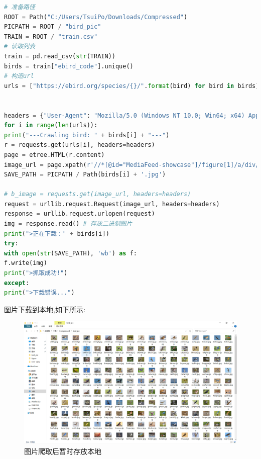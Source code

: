 \begin{itemize}
\begin{lstlisting}[language=python,breaklines=true]
# 准备路径
ROOT = Path("C:/Users/TsuiPo/Downloads/Compressed")
PICPATH = ROOT / "bird_pic"
TRAIN = ROOT / "train.csv"
# 读取列表
train = pd.read_csv(str(TRAIN))
birds = train["ebird_code"].unique()
# 构造url
urls = ["https://ebird.org/species/{}/".format(bird) for bird in birds]


headers = {"User-Agent": "Mozilla/5.0 (Windows NT 10.0; Win64; x64) AppleWebKit/537.36 (KHTML, like Gecko) Chrome/90.0.4430.93 Safari/537.36",}
for i in range(len(urls)):
print("---Crawling bird: " + birds[i] + "---")
r = requests.get(urls[i], headers=headers)
page = etree.HTML(r.content)
image_url = page.xpath(r'//*[@id="MediaFeed-showcase"]/figure[1]/a/div/img/@src')[0]
SAVE_PATH = PICPATH / Path(birds[i] + '.jpg')

# b_image = requests.get(image_url, headers=headers)
request = urllib.request.Request(image_url, headers=headers)
response = urllib.request.urlopen(request)
img = response.read() # 存放二进制图片
print(">正在下载：" + birds[i])
try:
with open(str(SAVE_PATH), 'wb') as f:
f.write(img)
print(">抓取成功!")
except:
print(">下载错误...")
	\end{lstlisting}
	图片下载到本地,如下所示:
	\begin{figure}[thbp!]
		\centering
		\includegraphics[scale=0.2]{figure/birds}
		\caption{图片爬取后暂时存放本地}
	\end{figure}
\end{itemize}


